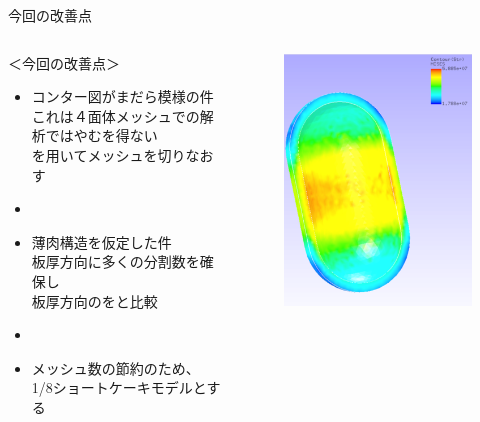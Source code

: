 \begin{frame}{今回の改善点}
 
    \begin{columns}[t]
    \begin{column}{0.7\textwidth}
        ＜今回の改善点＞ \\
         \begin{itemize}
            \item[①] コンター図がまだら模様の件 \\
                     これは４面体メッシュでの解析ではやむを得ない \\
                     を用いてメッシュを切りなおす
            \item[]
            \item[②] 薄肉構造を仮定した件 \\
                     板厚方向に多くの分割数を確保し \\
                     板厚方向のをと比較
            \item[]
            \item[③] メッシュ数の節約のため、\\
                     1/8ショートケーキモデルとする
         \end{itemize}
    \end{column}
    \begin{column}{0.3\textwidth}
      \begin{figure}[htbp]
        \begin{center}
          \includegraphics[keepaspectratio,scale=1.5]{images/previous.png}

\end{center}
\end{figure}
\end{column}
\end{columns}
\end{frame}
